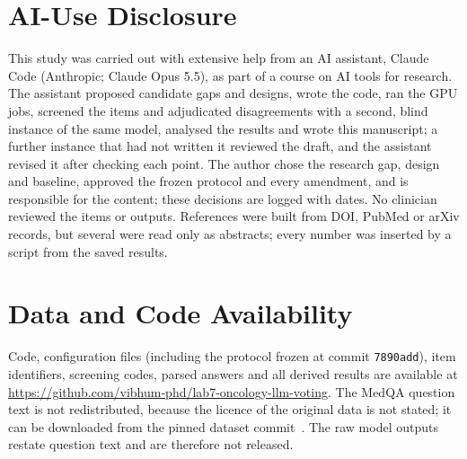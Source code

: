 \section*{AI-Use Disclosure}
This study was carried out with extensive help from an AI assistant, Claude Code (Anthropic; Claude Opus 5.5), as part
of a course on AI tools for research. The assistant proposed candidate gaps and designs, wrote the code, ran the GPU
jobs, screened the items and adjudicated disagreements with a second, blind instance of the same model, analysed the
results and wrote this manuscript; a further instance that had not written it reviewed the draft, and the assistant
revised it after checking each point. The author chose the research gap, design and baseline, approved the frozen
protocol and every amendment, and is responsible for the content; these decisions are logged with dates. No clinician
reviewed the items or outputs. References were built from DOI, PubMed or arXiv records, but several were read only as
abstracts; every number was inserted by a script from the saved results.

\section*{Data and Code Availability}
Code, configuration files (including the protocol frozen at commit \texttt{7890add}), item identifiers, screening
codes, parsed answers and all derived results are available at
\url{https://github.com/vibhum-phd/lab7-oncology-llm-voting}. The MedQA question text is not redistributed, because
the licence of the original data is not stated; it can be downloaded from the pinned dataset commit~\cite{medqa_hf}.
The raw model outputs restate question text and are therefore not released.
